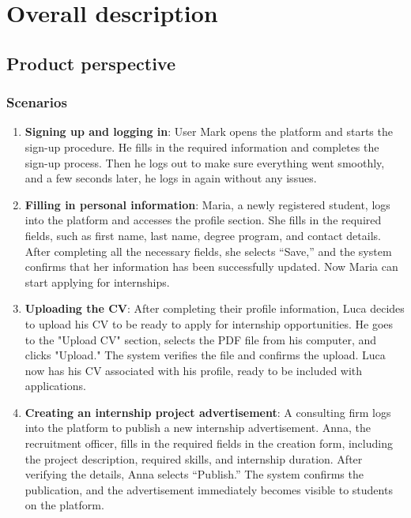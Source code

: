 \chapter{Overall description}

\section{Product perspective}

\subsection{Scenarios}

\begin{enumerate}[label=\textbf{S\arabic* -}]
    \item \textbf{Signing up and logging in}: 
    User Mark opens the platform and starts the sign-up procedure. 
    He fills in the required information and completes the sign-up process. 
    Then he logs out to make sure everything went smoothly, and a few seconds later, he logs in again without any issues.
    \item \textbf {Filling in personal information}: 
    Maria, a newly registered student, logs into the platform and accesses the profile section. 
    She fills in the required fields, such as first name, last name, degree program, and contact details. 
    After completing all the necessary fields, she selects “Save,” and the system confirms that her information has been successfully updated. 
    Now Maria can start applying for internships.
    \item \textbf {Uploading the CV}: 
    After completing their profile information, Luca decides to upload his CV to be ready to apply for internship opportunities. 
    He goes to the "Upload CV" section, selects the PDF file from his computer, and clicks "Upload." 
    The system verifies the file and confirms the upload. 
    Luca now has his CV associated with his profile, ready to be included with applications.
    \item \textbf {Creating an internship project advertisement}: 
    A consulting firm logs into the platform to publish a new internship advertisement. 
    Anna, the recruitment officer, fills in the required fields in the creation form, including the project description, required skills, and internship duration. 
    After verifying the details, Anna selects “Publish.” The system confirms the publication, and the advertisement immediately becomes visible to students on the platform.

\end{enumerate}
